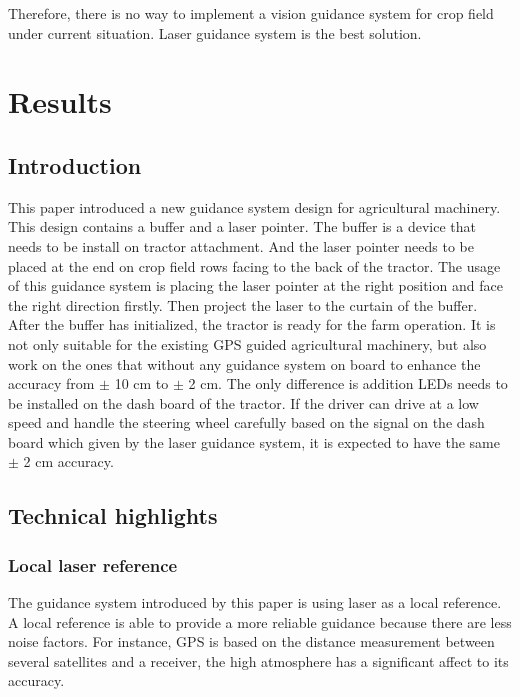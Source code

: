 \documentclass[12pt]{article}
\begin{document}
\begin{flushleft}
\begin{itemize}
\end{itemize}

Therefore, there is no way to implement a vision guidance system for crop field under current situation. Laser guidance system is the best solution.

\section{Results}

\subsection{Introduction}
This paper introduced a new guidance system design for agricultural machinery. This design contains a buffer and a laser pointer. The buffer is a device that needs to be install on tractor attachment. And the laser pointer needs to be placed at the end on crop field rows facing to the back of the tractor. The usage of this guidance system is placing the laser pointer at the right position and face the right direction firstly. Then project the laser to the curtain of the buffer. After the buffer has initialized, the tractor is ready for the farm operation. It is not only suitable for the existing GPS guided agricultural machinery, but also work on the ones that without any guidance system on board to enhance the accuracy from $\pm$ 10 cm to $\pm$ 2 cm. The only difference is addition LEDs needs to be installed on the dash board of the tractor. If the driver can drive at a low speed and handle the steering wheel carefully based on the signal on the dash board which given by the laser guidance system, it is expected to have the same $\pm$ 2 cm accuracy. 


\subsection{Technical highlights}

\subsubsection{Local laser reference}
The guidance system introduced by this paper is using laser as a local reference. A local reference is able to provide a more reliable guidance because there are less noise factors. For instance, GPS is based on the distance measurement between several satellites and a receiver, the high atmosphere has a significant affect to its accuracy. 


\end{flushleft}
\end{document}
